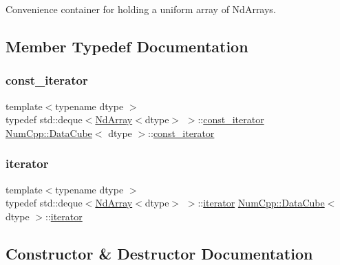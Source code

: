 Convenience container for holding a uniform array of Nd\+Arrays. 

\subsection{Member Typedef Documentation}
\mbox{\label{class_num_cpp_1_1_data_cube_a5916086d9b71149eaa35651e2212de39}} 
\subsubsection{\texorpdfstring{const\+\_\+iterator}{const\_iterator}}
{\footnotesize\ttfamily template$<$typename dtype $>$ \\
typedef std\+::deque$<$\mbox{\hyperlink{class_num_cpp_1_1_nd_array}{Nd\+Array}}$<$dtype$>$ $>$\+::\mbox{\hyperlink{class_num_cpp_1_1_data_cube_a5916086d9b71149eaa35651e2212de39}{const\+\_\+iterator}} \mbox{\hyperlink{class_num_cpp_1_1_data_cube}{Num\+Cpp\+::\+Data\+Cube}}$<$ dtype $>$\+::\mbox{\hyperlink{class_num_cpp_1_1_data_cube_a5916086d9b71149eaa35651e2212de39}{const\+\_\+iterator}}}

\mbox{\label{class_num_cpp_1_1_data_cube_a817f739957d3d426e8a19a66867674ba}} 
\subsubsection{\texorpdfstring{iterator}{iterator}}
{\footnotesize\ttfamily template$<$typename dtype $>$ \\
typedef std\+::deque$<$\mbox{\hyperlink{class_num_cpp_1_1_nd_array}{Nd\+Array}}$<$dtype$>$ $>$\+::\mbox{\hyperlink{class_num_cpp_1_1_data_cube_a817f739957d3d426e8a19a66867674ba}{iterator}} \mbox{\hyperlink{class_num_cpp_1_1_data_cube}{Num\+Cpp\+::\+Data\+Cube}}$<$ dtype $>$\+::\mbox{\hyperlink{class_num_cpp_1_1_data_cube_a817f739957d3d426e8a19a66867674ba}{iterator}}}



\subsection{Constructor \& Destructor Documentation}
\mbox{\label{class_num_cpp_1_1_data_cube_a2be1915c2d9da633b802579690b7cc29}} 
